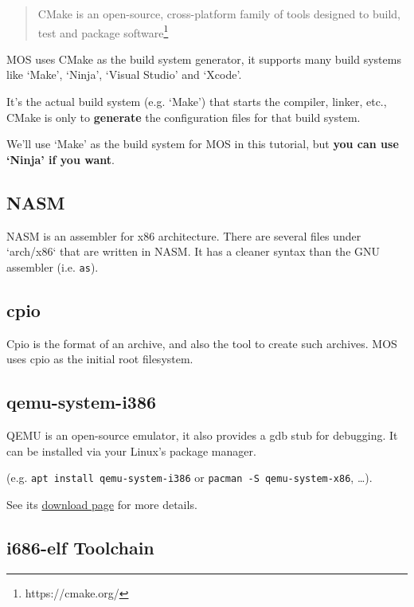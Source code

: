 \begin{quote}
    CMake is an open-source, cross-platform family of tools designed to build, test and package
    software\footnote{https://cmake.org/}
\end{quote}

MOS uses CMake as the build system generator, it supports many build systems like `Make', `Ninja',
`Visual Studio' and `Xcode'.

\begin{note}
    \item It's the actual build system (e.g. `Make') that starts the compiler, linker, etc.,
    CMake is only to \textbf{generate} the configuration files for that build system.
\end{note}

We'll use `Make' as the build system for MOS in this tutorial, but
\textbf{you can use `Ninja' if you want}.

\subsection{NASM} \label{sec:nasm}

NASM is an assembler for x86 architecture. There are several files under `arch/x86`
that are written in NASM. It has a cleaner syntax than the GNU assembler (i.e. \texttt{as}).

\subsection{cpio} \label{sec:cpio}

Cpio is the format of an archive, and also the tool to create such archives. MOS uses cpio as
the initial root filesystem.

\subsection{qemu-system-i386} \label{sec:qemu}

QEMU is an open-source emulator, it also provides a gdb stub for debugging. It can be
installed via your Linux's package manager.

(e.g. \texttt{apt install qemu-system-i386} or \texttt{pacman -S qemu-system-x86}, \dots).

See its \href{https://www.qemu.org/download}{download page} for more details.

\subsection{i686-elf Toolchain} \label{sec:cross-compiler}

